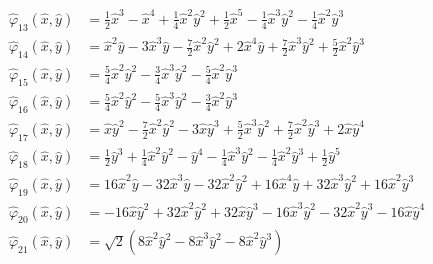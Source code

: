 \begin{equation}
\begin{split}
  \hat{\varphi}_{13}(\hat{x},\hat{y}) &= \frac{1}{2}\hat{x}^3-\hat{x}^4+\frac{1}{4}\hat{x}^2\hat{y}^2+\frac{1}{2}\hat{x}^5-\frac{1}{4}\hat{x}^3\hat{y}^2-\frac{1}{4}\hat{x}^2\hat{y}^3 \\
  \hat{\varphi}_{14}(\hat{x},\hat{y}) &= \hat{x}^2\hat{y}-3\hat{x}^3\hat{y}-\frac{7}{2}\hat{x}^2\hat{y}^2+2\hat{x}^4\hat{y}+\frac{7}{2}\hat{x}^3\hat{y}^2+\frac{5}{2}\hat{x}^2\hat{y}^3 \\
  \hat{\varphi}_{15}(\hat{x},\hat{y}) &= \frac{5}{4}\hat{x}^2\hat{y}^2-\frac{3}{4}\hat{x}^3\hat{y}^2-\frac{5}{4}\hat{x}^2\hat{y}^3 \\
  \hat{\varphi}_{16}(\hat{x},\hat{y}) &= \frac{5}{4}\hat{x}^2\hat{y}^2-\frac{5}{4}\hat{x}^3\hat{y}^2-\frac{3}{4}\hat{x}^2\hat{y}^3 \\
  \hat{\varphi}_{17}(\hat{x},\hat{y}) &= \hat{x}\hat{y}^2-\frac{7}{2}\hat{x}^2\hat{y}^2-3\hat{x}\hat{y}^3+\frac{5}{2}\hat{x}^3\hat{y}^2+\frac{7}{2}\hat{x}^2\hat{y}^3+2\hat{x}\hat{y}^4 \\
  \hat{\varphi}_{18}(\hat{x},\hat{y}) &= \frac{1}{2}\hat{y}^3+\frac{1}{4}\hat{x}^2\hat{y}^2-\hat{y}^4-\frac{1}{4}\hat{x}^3\hat{y}^2-\frac{1}{4}\hat{x}^2\hat{y}^3+\frac{1}{2}\hat{y}^5 \\
  \hat{\varphi}_{19}(\hat{x},\hat{y}) &= 16\hat{x}^2\hat{y}-32\hat{x}^3\hat{y}-32\hat{x}^2\hat{y}^2+16\hat{x}^4\hat{y}+32\hat{x}^3\hat{y}^2+16\hat{x}^2\hat{y}^3 \\
  \hat{\varphi}_{20}(\hat{x},\hat{y}) &= -16\hat{x}\hat{y}^2+32\hat{x}^2\hat{y}^2+32\hat{x}\hat{y}^3-16\hat{x}^3\hat{y}^2-32\hat{x}^2\hat{y}^3-16\hat{x}\hat{y}^4 \\
  \hat{\varphi}_{21}(\hat{x},\hat{y}) &= \sqrt{2}\left(8\hat{x}^2\hat{y}^2-8\hat{x}^3\hat{y}^2-8\hat{x}^2\hat{y}^3\right)
\end{split}
\label{eqn:Argyris}
\end{equation}


